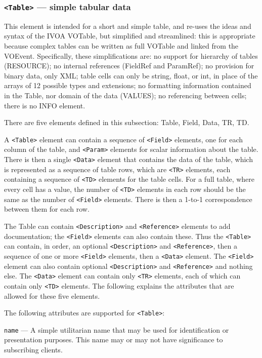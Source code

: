 \documentclass[11pt,a4paper]{ivoa}
\begin{document}
\subsubsection{{\tt <Table>} --- simple tabular data}
\label{sec:3.3.3}
This element is intended for a short and simple table, and re-uses the ideas and syntax of the IVOA VOTable, but simplified and streamlined: this is appropriate because complex tables can be written as full VOTable and linked from the VOEvent. Specifically, these simplifications are: no support for hierarchy of tables (RESOURCE); no internal references (FieldRef and ParamRef); no provision for binary data, only XML; table cells can only be string, float, or int, in place of the arrays of 12 possible types and extensions; no formatting information contained in the Table, nor domain of the data (VALUES); no referencing between cells; there is no INFO element. 

There are five elements defined in this subsection: Table, Field, Data, TR, TD.

A {\tt <Table>} element can contain a sequence of {\tt <Field>} elements, one for each column of the table, and {\tt <Param>} elements for scalar information about the table. There is then a single {\tt <Data>} element that contains the data of the table, which is represented as a sequence of table rows, which are {\tt <TR>} elements, each containing a sequence of {\tt <TD>} elements for the table cells. For a full table, where every cell has a value, the number of {\tt <TD>} elements in each row should be the same as the number of {\tt <Field>} elements. There is then a 1-to-1 correspondence between them for each row. 

The Table can contain {\tt <Description>} and {\tt <Reference>} elements to add documentation; the {\tt <Field>} elements can also contain these. Thus the {\tt <Table>} can contain, in order, an optional {\tt <Description>} and {\tt <Reference>}, then a sequence of one or more {\tt <Field>} elements, then a {\tt <Data>} element. The {\tt <Field>} element can also contain optional {\tt <Description>} and {\tt <Reference>} and nothing else. The {\tt <Data>} element can contain only {\tt <TR>} elements, each of which can contain only {\tt <TD>} elements. The following explains the attributes that are allowed for these five elements. 

The following attributes are supported for {\tt <Table>}: 

 {\tt name}\label{sec:3.3.3.1} --- A simple utilitarian name that may be used for identification or presentation purposes. This name may or may not have significance to subscribing clients. 
\end{document}
